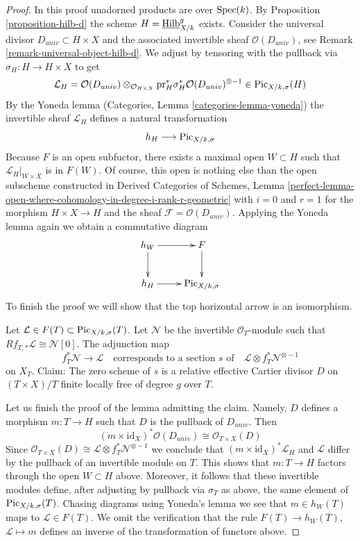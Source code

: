 \begin{proof}
In this proof unadorned products are over $\mathop{\mathrm{Spec}}(k)$.
By Proposition \ref{proposition-hilb-d} the scheme
$H = \underline{\mathrm{Hilb}}^g_{X/k}$ exists.
Consider the universal divisor $D_{univ} \subset H \times X$
and the associated invertible sheaf $\mathcal{O}(D_{univ})$, see
Remark \ref{remark-universal-object-hilb-d}.
We adjust by tensoring with the pullback via
$\sigma_H : H \to H \times X$ to get
$$
\mathcal{L}_H =
\mathcal{O}(D_{univ})
\otimes_{\mathcal{O}_{H \times X}}
\text{pr}_H^*\sigma_H^*\mathcal{O}(D_{univ})^{\otimes -1}
\in
\mathrm{Pic}_{X/k, \sigma}(H)
$$
By the Yoneda lemma (Categories, Lemma \ref{categories-lemma-yoneda})
the invertible sheaf $\mathcal{L}_H$ defines a natural transformation
$$
h_H \longrightarrow \mathrm{Pic}_{X/k, \sigma}
$$
Because $F$ is an open subfuctor, there exists a maximal open
$W \subset H$ such that $\mathcal{L}_H|_{W \times X}$ is in
$F(W)$. Of course, this open is nothing else than the
open subscheme constructed in
Derived Categories of Schemes, Lemma
\ref{perfect-lemma-open-where-cohomology-in-degree-i-rank-r-geometric}
with $i = 0$ and $r = 1$ for the morphism $H \times X \to H$ and the sheaf
$\mathcal{F} = \mathcal{O}(D_{univ})$. Applying the Yoneda lemma
again we obtain a commutative diagram
$$
\xymatrix{
h_W \ar[d] \ar[r] & F \ar[d] \\
h_H \ar[r] & \Picardfunctor_{X/k, \sigma}
}
$$
To finish the proof we will show that the top horizontal arrow is an
isomorphism.

\medskip\noindent
Let $\mathcal{L} \in F(T) \subset \mathrm{Pic}_{X/k, \sigma}(T)$.
Let $\mathcal{N}$ be the invertible $\mathcal{O}_T$-module
such that $Rf_{T, *}\mathcal{L} \cong \mathcal{N}[0]$.
The adjunction map
$$
f_T^*\mathcal{N} \longrightarrow \mathcal{L}
\quad\text{corresponds to a section }s\text{ of}\quad
\mathcal{L} \otimes f_T^*\mathcal{N}^{\otimes -1}
$$
on $X_T$. Claim: The zero scheme of $s$ is a relative effective Cartier
divisor $D$ on $(T \times X)/T$ finite locally free of degree $g$ over $T$.

\medskip\noindent
Let us finish the proof of the lemma admitting the claim.
Namely, $D$ defines a morphism $m : T \to H$ such that $D$ is the pullback of
$D_{univ}$. Then
$$
(m \times \text{id}_X)^*\mathcal{O}(D_{univ}) \cong
\mathcal{O}_{T \times X}(D)
$$
Since $\mathcal{O}_{T \times X}(D) \cong
\mathcal{L} \otimes f_T^*\mathcal{N}^{\otimes -1}$
we conclude that $(m \times \text{id}_X)^*\mathcal{L}_H$ and $\mathcal{L}$
differ by the pullback of an invertible module on $T$.
This shows that $m : T \to H$ factors through the open $W \subset H$ above.
Moreover, it follows that these invertible modules define, after adjusting
by pullback via $\sigma_T$ as above, the same element of
$\mathrm{Pic}_{X/k, \sigma}(T)$. Chasing diagrams using Yoneda's lemma
we see that $m \in h_W(T)$ maps to $\mathcal{L} \in F(T)$. We omit
the verification that the rule $F(T) \to h_W(T)$,
$\mathcal{L} \mapsto m$ defines an inverse of the transformation
of functors above.


\end{proof}
